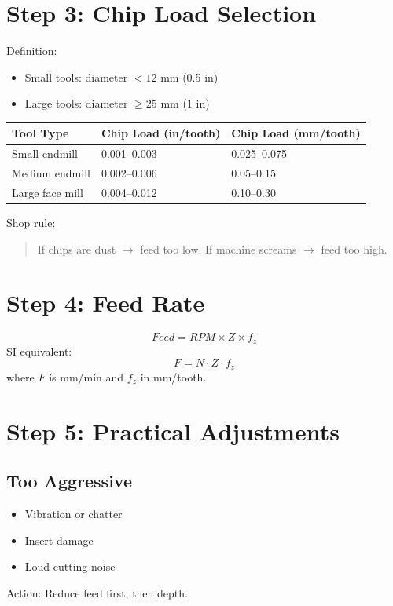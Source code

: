 \documentclass{article}
\begin{document}
\section*{Step 3: Chip Load Selection}

Definition:
\begin{itemize}
\item Small tools: diameter $< 12$ mm (0.5 in)
\item Large tools: diameter $\geq 25$ mm (1 in)
\end{itemize}

\begin{center}
\begin{tabular}{lll}
\toprule
Tool Type & Chip Load (in/tooth) & Chip Load (mm/tooth) \\
\midrule
Small endmill & 0.001--0.003 & 0.025--0.075 \\
Medium endmill & 0.002--0.006 & 0.05--0.15 \\
Large face mill & 0.004--0.012 & 0.10--0.30 \\
\bottomrule
\end{tabular}
\end{center}

Shop rule:
\begin{quote}
If chips are dust $\rightarrow$ feed too low. If machine screams $\rightarrow$ feed too high.
\end{quote}

\section*{Step 4: Feed Rate}
\[
Feed = RPM \times Z \times f_z
\]
SI equivalent:
\[
F = N \cdot Z \cdot f_z
\]
where $F$ is mm/min and $f_z$ in mm/tooth.

\section*{Step 5: Practical Adjustments}

\subsection*{Too Aggressive}
\begin{itemize}
\item Vibration or chatter
\item Insert damage
\item Loud cutting noise
\end{itemize}
Action: Reduce feed first, then depth.
\end{document}
